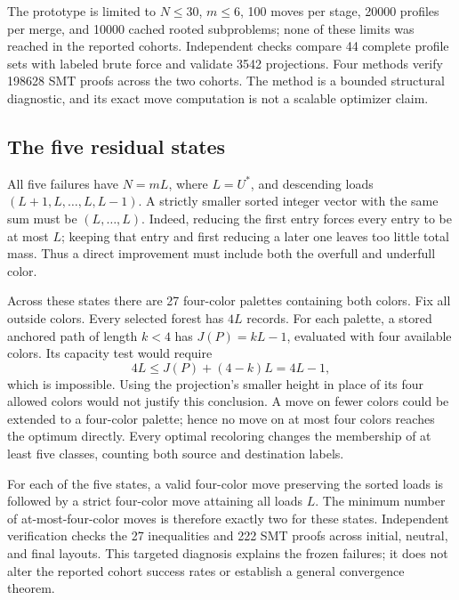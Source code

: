 The prototype is limited to $N\le30$, $m\le6$, 100 moves per stage,
20000 profiles per merge, and 10000 cached rooted subproblems; none
of these limits was reached in the reported cohorts. Independent
checks compare 44 complete profile sets with labeled brute force and
validate 3542 projections. Four methods verify 198628 SMT proofs
across the two cohorts. The method is a bounded structural diagnostic,
and its exact move computation is not a scalable optimizer claim.



\subsection{The five residual states}
\label{sec:plateau-diagnostic}
All five failures have $N=mL$, where $L=U^*$, and descending loads
$(L+1,L,\ldots,L,L-1)$. A strictly smaller sorted integer vector with
the same sum must be $(L,\ldots,L)$. Indeed, reducing the first entry
forces every entry to be at most $L$; keeping that entry and first
reducing a later one leaves too little total mass. Thus a direct
improvement must include both the overfull and underfull color.

Across these states there are 27 four-color palettes containing both
colors. Fix all outside colors. Every selected forest has $4L$ records.
For each palette, a stored anchored path of length $k<4$ has
$J(P)=kL-1$, evaluated with four available colors. Its capacity test
would require
\begin{equation}
 4L\le J(P)+(4-k)L=4L-1,
 \label{eq:supp-plateau-obstruction}
\end{equation}
which is impossible. Using the projection's smaller height in place
of its four allowed colors would not justify this conclusion.
A move on fewer colors could be extended to a four-color palette;
hence no move on at most four colors reaches the optimum directly.
Every optimal recoloring changes the membership of at least five
classes, counting both source and destination labels.

For each of the five states, a valid four-color move preserving the
sorted loads is followed by a strict four-color move attaining all
loads $L$. The minimum number of at-most-four-color moves is therefore
exactly two for these states. Independent verification checks the
27 inequalities and 222 SMT proofs across initial, neutral, and final
layouts. This targeted diagnosis explains the frozen failures; it
does not alter the reported cohort success rates or establish a
general convergence theorem.
